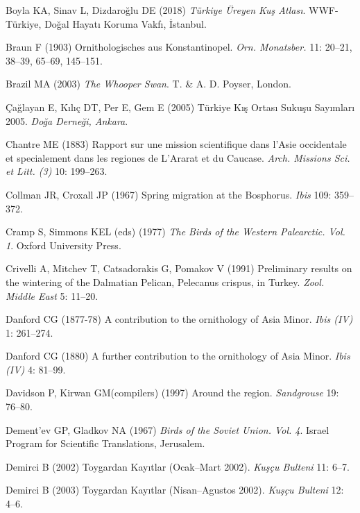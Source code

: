 \documentclass[
  letterpaper,
  DIV=11,
  numbers=noendperiod]{scrreprt}
\newlength{\cslhangindent}
\newenvironment{CSLReferences}[2] %
 {\begin{list}{}{%
  \setlength{\itemindent}{0pt}
  \setlength{\leftmargin}{0pt}
  \setlength{\parsep}{0pt}
  \ifodd #1
   \setlength{\leftmargin}{\cslhangindent}
   \setlength{\itemindent}{-1\cslhangindent}
  \fi
  \setlength{\itemsep}{#2\baselineskip}}}
 {\end{list}}
\begin{document}
\begin{CSLReferences}{0}{1}
Boyla KA, Sinav L, Dizdaroğlu DE (2018) \emph{{Türkiye Üreyen Kuş
Atlası}}. WWF-Türkiye, Doğal Hayatı Koruma Vakfı, İstanbul.

Braun F (1903) {Ornithologisches aus Konstantinopel}. \emph{Orn.
Monatsber.} 11: 20--21, 38--39, 65--69, 145--151.

Brazil MA (2003) \emph{{The Whooper Swan}}. T. \& A. D. Poyser, London.

Çağlayan E, Kılıç DT, Per E, Gem E (2005) {Türkiye Kış Ortası Sukuşu
Sayımları 2005}. \emph{Doğa Derneği, Ankara}.

Chantre ME (1883) {Rapport sur une mission scientifique dans l'Asie
occidentale et specialement dans les regiones de L'Ararat et du
Caucase}. \emph{Arch. Missions Sci. et Litt. (3)} 10: 199--263.

Collman JR, Croxall JP (1967) {Spring migration at the Bosphorus}.
\emph{Ibis} 109: 359--372.

Cramp S, Simmons KEL (eds) (1977) \emph{{The Birds of the Western
Palearctic. Vol. 1}}. Oxford University Press.

Crivelli A, Mitchev T, Catsadorakis G, Pomakov V (1991) {Preliminary
results on the wintering of the Dalmatian Pelican, Pelecanus crispus, in
Turkey}. \emph{Zool. Middle East} 5: 11--20.

Danford CG (1877-78) {A contribution to the ornithology of Asia Minor}.
\emph{Ibis (IV)} 1: 261--274.

Danford CG (1880) {A further contribution to the ornithology of Asia
Minor}. \emph{Ibis (IV)} 4: 81--99.

Davidson P, Kirwan GM(compilers) (1997) {Around the region}.
\emph{Sandgrouse} 19: 76--80.

Dement'ev GP, Gladkov NA (1967) \emph{{Birds of the Soviet Union. Vol.
4}}. Israel Program for Scientific Translations, Jerusalem.

Demirci B (2002) {Toygardan Kayıtlar (Ocak--Mart 2002)}. \emph{Kuşçu
Bulteni} 11: 6--7.

Demirci B (2003) {Toygardan Kayıtlar (Nisan--Agustos 2002)}. \emph{Kuşçu
Bulteni} 12: 4--6.


\end{CSLReferences}
\end{document}

